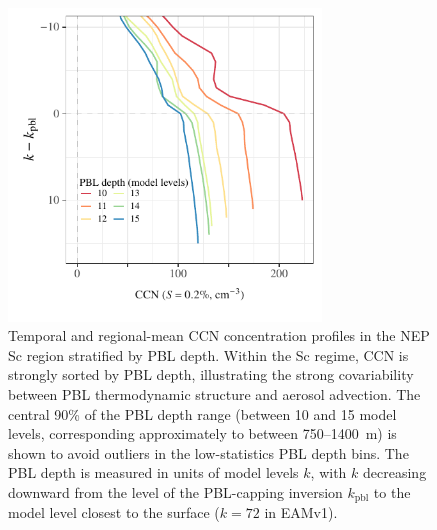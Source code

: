 \documentclass[acp, manuscript]{copernicus}\usepackage[]{graphicx}\usepackage[]{xcolor}
\newenvironment{knitrout}{}{} %
\begin{document}
\begin{figure}[t]
  \centering
\begin{knitrout}
\color{fgcolor}

{\centering \includegraphics[width=8.3cm]{figure/profiles-ccn-1} 

}


\end{knitrout}
  \caption{Temporal and regional-mean CCN concentration profiles in the NEP Sc
    region stratified by PBL depth.  Within the Sc regime, CCN is strongly
    sorted by PBL depth, illustrating the strong covariability between PBL
    thermodynamic structure and aerosol advection.
    The central 90\% of the PBL depth range (between 10 and 15 model levels,
    corresponding approximately to between 750--1400~m) is shown to avoid outliers in the
    low-statistics PBL depth bins.  The PBL depth is measured in units of model
    levels $k$, with $k$ decreasing downward from the level of the PBL-capping
    inversion $k_\text{pbl}$ to the model level closest to the surface ($k=72$
    in EAMv1).}
  \label{fig:ccnprof}
\end{figure}
%
\clearpage
%
\end{document}
